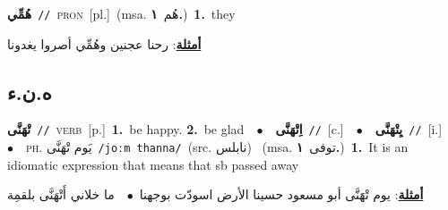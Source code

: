 \documentclass[10pt,a4paper,twoside]{article} %
\begin{document}
\begin{multicols}{2}
{\setlength\topsep{0pt}\textbf{\foreignlanguage{arabic}{هُمِّي}}\ {\color{gray}\texttt{//}\color{black}}\ \textsc{pron}\ [pl.]\ \color{gray}(msa. \foreignlanguage{arabic}{هُم}~\foreignlanguage{arabic}{\textbf{١.}})\color{black}\ \textbf{1.}~they\  \begin{flushright}\color{gray}\foreignlanguage{arabic}{\textbf{\underline{\foreignlanguage{arabic}{أمثلة}}}: رحنا عجنين وهُمِّي أصروا يغدونا}\end{flushright}\color{black}} \vspace{2mm}

\vspace{-3mm}
\subsection*{\color{blue}\foreignlanguage{arabic}{ه.ن.ء}\color{blue}{}} 

{\setlength\topsep{0pt}\textbf{\foreignlanguage{arabic}{تْهَنَّى}}\ {\color{gray}\texttt{//}\color{black}}\ \textsc{verb}\ [p.]\ \textbf{1.}~be happy.  \textbf{2.}~be glad\ \ $\bullet$\ \ \setlength\topsep{0pt}\textbf{\foreignlanguage{arabic}{اِتْهَنَّى}}\ {\color{gray}\texttt{//}\color{black}}\ [c.]\ \ $\bullet$\ \ \setlength\topsep{0pt}\textbf{\foreignlanguage{arabic}{يِتْهَنَّى}}\ {\color{gray}\texttt{//}\color{black}}\ [i.]\ \ $\bullet$\ \ \textsc{ph.} \color{gray} \foreignlanguage{arabic}{يَوم تْهَنَّى}\color{black}\ {\color{gray}\texttt{/{\sffamily joːm thanna}/}\color{black}}\ \color{gray}(src. \foreignlanguage{arabic}{نابلس})\color{black}\ \color{gray} (msa. \foreignlanguage{arabic}{توفى}~\foreignlanguage{arabic}{\textbf{١.}})\color{black}\ \textbf{1.}~It is an idiomatic expression that means that sb passed away\  \begin{flushright}\color{gray}\foreignlanguage{arabic}{\textbf{\underline{\foreignlanguage{arabic}{أمثلة}}}: يوم تْهََنَّى أبو مسعود حسينا الأرض اسودّت بوجهنا\ $\bullet$\ \  ما خلاني أَتْهَنَّى بلقمِة}\end{flushright}\color{black}} \vspace{2mm}


\end{multicols}
\end{document}
